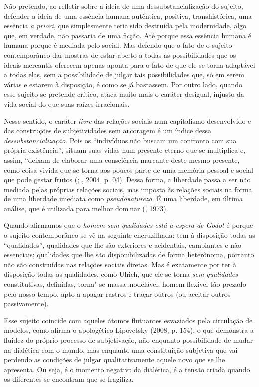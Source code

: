 Não pretendo, ao refletir sobre a ideia de uma dessubstancialização
do sujeito, defender a ideia de uma essência humana autêntica, positiva,
transhistórica, uma essência \emph{a priori}, que simplesmente teria
sido destruída pela modernidade, algo que, em verdade, não passaria de
uma ficção. Até porque essa essência humana é humana porque é mediada
pelo social. Mas defendo que o fato de o sujeito contemporâneo dar
mostras de estar aberto a todas as possibilidades que os ideais
mercantis oferecem apenas aponta para o fato de que ele se torna
adaptável a todas elas, sem a possibilidade de julgar tais
possibilidades que, só em serem várias e estarem à disposição, é como se
já bastassem. Por outro lado, quando esse sujeito se pretende crítico,
ataca muito mais o caráter desigual, injusto da vida social do que suas
raízes irracionais.

Nesse sentido, o caráter \emph{livre} das relações sociais num
capitalismo desenvolvido e das construções de subjetividades sem
ancoragem é um índice dessa \emph{dessubstancialização}. Pois os
``indivíduos não buscam um confronto com sua própria existência'',
situam suas vidas num presente eterno que se multiplica e, assim,
``deixam de elaborar uma consciência marcante deste mesmo presente, como
coisa vivida que se torna aos poucos parte de uma memória pessoal e
social que pode gestar frutos (; , 2004, p. 04). Dessa forma,
a liberdade passa a ser não mediada pelas próprias relações sociais, mas
imposta às relações sociais na forma de uma liberdade imediata como
\emph{pseudonatureza}. É uma liberdade, em última análise, que é
utilizada para melhor dominar (, 1973).


Quando afirmamos que o \emph{homem sem qualidades está à espera de Godot} é porque o sujeito contemporâneo se vê na seguinte encruzilhada: tem à disposição
todas as ``qualidades'', qualidades que lhe são exteriores e acidentais,
cambiantes e não essenciais; qualidades que lhe são disponibilizadas de
forma heterônoma, portanto não são construídas nas relações sociais
diretas. Mas é exatamente por ter à disposição todas as qualidades, como
Ulrich, que ele se torna \emph{sem qualidades} constitutivas, definidas,
torna"-se massa modelável, homem flexível tão prezado pelo nosso tempo,
apto a apagar rastros e traçar outros (ou aceitar outros passivamente).

Esse sujeito coincide com aqueles átomos flutuantes esvaziados pela
circulação de modelos, como afirma o apologético Lipovetsky (2008, p.
154), o que demonstra a fluidez do próprio processo de subjetivação, não
enquanto possibilidade de mudar na dialética com o mundo, mas enquanto
uma constituição subjetiva que vai perdendo as condições de julgar
qualitativamente aquele novo que se lhe apresenta. Ou seja, é o momento
negativo da dialética, é a tensão criada quando os diferentes se
encontram que se fragiliza.

